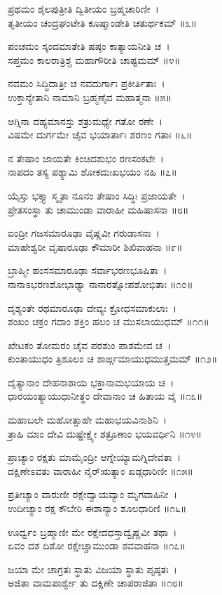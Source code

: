 ಪ್ರಥಮಂ ಶೈಲಪುತ್ರೀತಿ ದ್ವಿತೀಯಂ ಬ್ರಹ್ಮಚಾರಿಣೀ~।\\
ತೃತೀಯಂ ಚಂದ್ರಘಂಟೇತಿ ಕೂಷ್ಮಾಂಡೇತಿ ಚತುರ್ಥಕಮ್ ॥೩॥

ಪಂಚಮಂ ಸ್ಕಂದಮಾತೇತಿ ಷಷ್ಠಂ ಕಾತ್ಯಾಯನೀತಿ ಚ~।\\
ಸಪ್ತಮಂ ಕಾಲರಾತ್ರಿಶ್ಚ ಮಹಾಗೌರೀತಿ ಚಾಷ್ಟಮಮ್ ॥೪॥

ನವಮಂ ಸಿದ್ಧಿದಾತ್ರೀ ಚ ನವದುರ್ಗಾಃ ಪ್ರಕೀರ್ತಿತಾಃ~।\\
ಉಕ್ತಾನ್ಯೇತಾನಿ ನಾಮಾನಿ ಬ್ರಹ್ಮಣೈವ ಮಹಾತ್ಮನಾ ॥೫॥

ಅಗ್ನಿನಾ ದಹ್ಯಮಾನಸ್ತು ಶತ್ರುಮಧ್ಯೇ ಗತೋ ರಣೇ~।\\
ವಿಷಮೇ ದುರ್ಗಮೇ ಚೈವ ಭಯಾರ್ತಾಃ ಶರಣಂ ಗತಾಃ ॥೬॥

ನ ತೇಷಾಂ ಜಾಯತೇ ಕಿಂಚಿದಶುಭಂ ರಣಸಂಕಟೇ~।\\
ನಾಪದಂ ತಸ್ಯ ಪಶ್ಯಾಮಿ ಶೋಕದುಃಖಭಯಂ ನಹಿ ॥೭॥

ಯೈಸ್ತು ಭಕ್ತ್ಯಾ ಸ್ಮೃತಾ ನೂನಂ ತೇಷಾಂ ಸಿದ್ಧಿಃ ಪ್ರಜಾಯತೇ~।\\
ಪ್ರೇತಸಂಸ್ಥಾ ತು ಚಾಮುಂಡಾ ವಾರಾಹೀ ಮಹಿಷಾಸನಾ ॥೮॥

ಐಂದ್ರೀ ಗಜಸಮಾರೂಢಾ ವೈಷ್ಣವೀ ಗರುಡಾಸನಾ~।\\
ಮಾಹೇಶ್ವರೀ ವೃಷಾರೂಢಾ ಕೌಮಾರೀ ಶಿಖಿವಾಹನಾ ॥೯॥

ಬ್ರಾಹ್ಮೀ ಹಂಸಸಮಾರೂಢಾ ಸರ್ವಾಭರಣಭೂಷಿತಾ~।\\
ನಾನಾಽಭರಣಶೋಭಾಢ್ಯಾ ನಾನಾರತ್ನೋಪಶೋಭಿತಾಃ ॥೧೦॥

ದೃಶ್ಯಂತೇ ರಥಮಾರೂಢಾ ದೇವ್ಯಃ ಕ್ರೋಧಸಮಾಕುಲಾಃ~।\\
ಶಂಖಂ ಚಕ್ರಂ ಗದಾಂ ಶಕ್ತಿಂ ಹಲಂ ಚ ಮುಸಲಾಯುಧಮ್ ॥೧೧॥

ಖೇಟಕಂ ತೋಮರಂ ಚೈವ ಪರಶುಂ ಪಾಶಮೇವ ಚ~।\\
ಕುಂತಾಯುಧಂ ತ್ರಿಶೂಲಂ ಚ ಶಾರ್ಙ್ಗಮಾಯುಧಮುತ್ತಮಮ್ ॥೧೨॥

ದೈತ್ಯಾನಾಂ ದೇಹನಾಶಾಯ ಭಕ್ತಾನಾಮಭಯಾಯ ಚ~।\\
ಧಾರಯಂತ್ಯಾಯುಧಾನೀತ್ಥಂ ದೇವಾನಾಂ ಚ ಹಿತಾಯ ವೈ ॥೧೩॥

ಮಹಾಬಲೇ ಮಹೋತ್ಸಾಹೇ ಮಹಾಭಯವಿನಾಶಿನಿ~।\\
ತ್ರಾಹಿ ಮಾಂ ದೇವಿ ದುಷ್ಪ್ರೇಕ್ಷ್ಯೇ ಶತ್ರೂಣಾಂ ಭಯವರ್ಧಿನಿ ॥೧೪॥

ಪ್ರಾಚ್ಯಾಂ ರಕ್ಷತು ಮಾಮೈಂದ್ರೀ ಆಗ್ನೇಯ್ಯಾಮಗ್ನಿದೇವತಾ~।\\
ದಕ್ಷಿಣೇಽವತು ವಾರಾಹೀ ನೈರ್‌ಋತ್ಯಾಂ ಖಡ್ಗಧಾರಿಣೀ ॥೧೫॥

ಪ್ರತೀಚ್ಯಾಂ ವಾರುಣೀ ರಕ್ಷೇದ್ವಾಯವ್ಯಾಂ ಮೃಗವಾಹಿನೀ~।\\
ಉದೀಚ್ಯಾಂ ರಕ್ಷ ಕೌಬೇರಿ ಈಶಾನ್ಯಾಂ ಶೂಲಧಾರಿಣಿ ॥೧೬॥

ಊರ್ಧ್ವಂ ಬ್ರಹ್ಮಾಣೀ ಮೇ ರಕ್ಷೇದಧಸ್ತಾದ್ವೈಷ್ಣವೀ ತಥಾ~।\\
ಏವಂ ದಶ ದಿಶೋ ರಕ್ಷೇಚ್ಚಾಮುಂಡಾ ಶವವಾಹನಾ ॥೧೭॥

ಜಯಾ ಮೇ ಚಾಗ್ರತಃ ಸ್ಥಾತು ವಿಜಯಾ ಸ್ಥಾತು ಪೃಷ್ಠತಃ~।\\
ಅಜಿತಾ ವಾಮಪಾರ್ಶ್ವೇ ತು ದಕ್ಷಿಣೇ ಚಾಪರಾಜಿತಾ ॥೧೮॥

